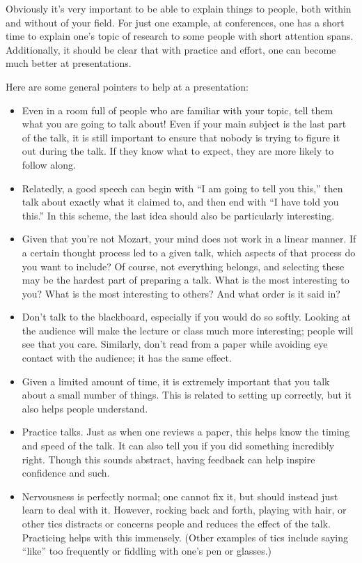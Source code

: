\label{present}
Obviously it's very important to be able to explain things to people, both within and without of your field. For just one example, at conferences, one has a short time to explain one's topic of research to some people with short attention spans. Additionally, it should be clear that with practice and effort, one can become much better at presentations.

Here are some general pointers to help at a presentation:
\begin{itemize}
\item Even in a room full of people who are familiar with your topic, tell them what you are going to talk about! Even if your main subject is the last part of the talk, it is still important to ensure that nobody is trying to figure it out during the talk. If they know what to expect, they are more likely to follow along.
\item Relatedly, a good speech can begin with ``I am going to tell you this,'' then talk about exactly what it claimed to, and then end with ``I have told you this.'' In this scheme, the last idea should also be particularly interesting.
\item Given that you're not Mozart, your mind does not work in a linear manner. If a certain thought process led to a given talk, which aspects of that process do you want to include? Of course, not everything belongs, and selecting these may be the hardest part of preparing a talk. What is the most interesting to you? What is the most interesting to others? And what order is it said in?
\item Don't talk to the blackboard, especially if you would do so softly. Looking at the audience will make the lecture or class much more interesting; people will see that you care. Similarly, don't read from a paper while avoiding eye contact with the audience; it has the same effect.
\item Given a limited amount of time, it is extremely important that you talk about a small number of things. This is related to setting up correctly, but it also helps people understand.
\item Practice talks. Just as when one reviews a paper, this helps know the timing and speed of the talk. It can also tell you if you did something incredibly right. Though this sounds abstract, having feedback can help inspire confidence and such.
\item Nervousness is perfectly normal; one cannot fix it, but should instead just learn to deal with it. However, rocking back and forth, playing with hair, or other tics distracts or concerns people and reduces the effect of the talk. Practicing helps with this immensely. (Other examples of tics include saying ``like'' too frequently or fiddling with one's pen or glasses.)

\end{itemize}

